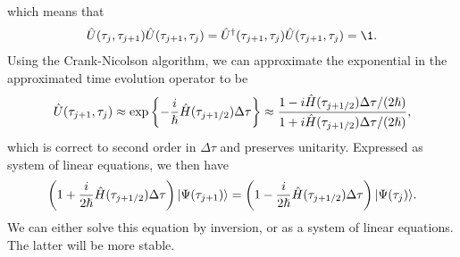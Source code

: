         which means that
        \begin{align}
            \hat{U}(\tau_j, \tau_{j + 1})
            \hat{U}(\tau_{j + 1}, \tau_j)
            = \hat{U}^{\dagger}(\tau_{j + 1}, \tau_j)
            \hat{U}(\tau_{j + 1}, \tau_j)
            = \1.
        \end{align}
        Using the Crank-Nicolson algorithm, we can approximate the exponential
        in the approximated time evolution operator to be
        \begin{align}
            \hat{U}(\tau_{j + 1}, \tau_j)
            \approx \exp\left\{ 
                -\frac{i}{\hslash}\hat{H}(\tau_{j + 1/2})\Delta \tau
             \right\}
            \approx
            \frac{1 - i\hat{H}(\tau_{j + 1/2})\Delta\tau/(2\hslash)}
            {1 + i\hat{H}(\tau_{j + 1/2})\Delta\tau/(2\hslash)},
        \end{align}
        which is correct to second order in $\Delta \tau$ and preserves
        unitarity. Expressed as system of linear equations, we then have
        \begin{align}
            \left( 
                1 + \frac{i}{2\hslash}\hat{H}(\tau_{j + 1/2})\Delta\tau
             \right)| \Psi(\tau_{j + 1}) \rangle
            =
            \left( 
                1 - \frac{i}{2\hslash}\hat{H}(\tau_{j + 1/2})\Delta\tau
             \right)| \Psi(\tau_{j}) \rangle.
        \end{align}
        We can either solve this equation by inversion, or as a system of linear
        equations. The latter will be more stable.
